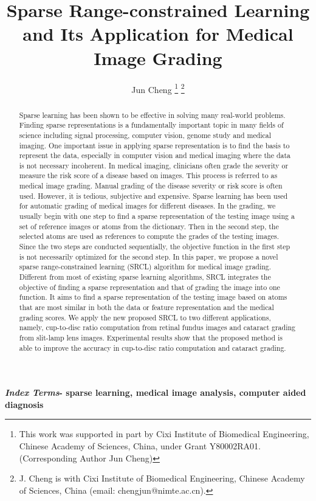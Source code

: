 \documentclass[journal]{IEEEtran}
\title{ Sparse Range-constrained Learning and Its Application for Medical Image Grading}
\author{Jun Cheng
 \thanks{This work was supported in part by  Cixi Institute of Biomedical Engineering, Chinese Academy of Sciences, China, under Grant Y80002RA01. (Corresponding Author Jun Cheng) }
\thanks{  J. Cheng is with Cixi Institute of Biomedical Engineering, Chinese Academy of Sciences, China (email: chengjun@nimte.ac.cn).}
 }
\begin{document}

\maketitle

 \begin{abstract}Sparse learning has been shown to be effective in
 	solving many real-world problems. Finding sparse representations
 	is a fundamentally important topic in many fields of
 	science including signal processing, computer vision, genome
 	study and medical imaging. One important issue in applying
 	sparse representation is to find the basis to represent the data,
 	especially in computer vision and medical imaging where the
 	data is not necessary incoherent. In medical imaging, clinicians
 	often grade the severity or measure the risk score of a disease
 	based on images. This process is referred to as medical image
 	grading. Manual grading of the disease severity or risk score
 	is often used. However, it is tedious, subjective and expensive.
 	Sparse learning has been used for automatic grading of medical
 	images for different diseases. In the grading, we usually begin
 	with one step to find a sparse representation of the testing image
 	using a set of reference images or atoms from the dictionary. Then
 	in the second step, the selected atoms are used as references to
 	compute the grades of the testing images. Since the two steps
 	are conducted sequentially, the objective function in the first
 	step is not necessarily optimized for the second step. In this
 	paper, we propose a novel sparse range-constrained learning
 	(SRCL) algorithm for medical image grading. Different from
 	most of existing sparse learning algorithms, SRCL integrates
 	the objective of finding a sparse representation and that of
 	grading the image into one function. It aims to find a sparse
 	representation of the testing image based on atoms that are
 	most similar in both the data or feature representation and the
 	medical grading scores. We apply the new proposed SRCL to
 	two different applications, namely, cup-to-disc ratio computation
 	from retinal fundus images and cataract grading from slit-lamp
 	lens images. Experimental results show that the proposed method
 	is able to improve the accuracy in cup-to-disc ratio computation
 	and cataract grading.




 \end{abstract}
  \textbf{\emph{Index Terms}-
   sparse learning, medical image analysis, computer aided diagnosis}
\end{document}
